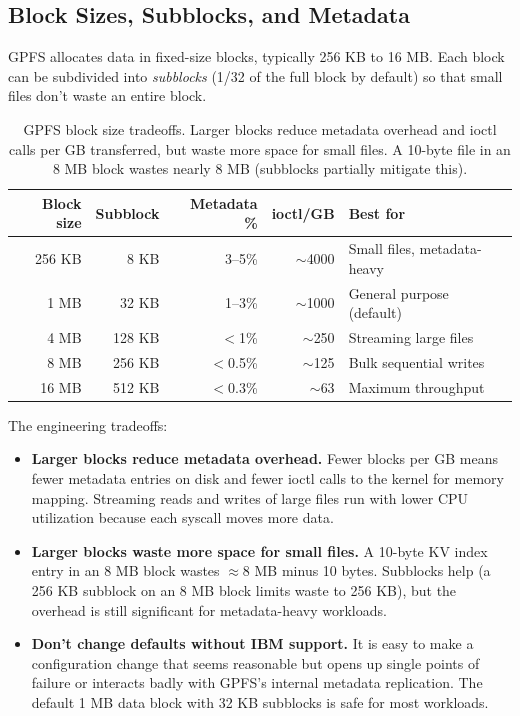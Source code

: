 \documentclass[11pt,letterpaper]{article}
\begin{document}
\subsection{Block Sizes, Subblocks, and Metadata}

GPFS allocates data in fixed-size blocks, typically 256 KB to 16 MB. Each block can be subdivided into \emph{subblocks} (1/32 of the full block by default) so that small files don't waste an entire block.

\begin{table}[ht]
\centering\small
\begin{tabular}{rrrrl}
\toprule
\textbf{Block size} & \textbf{Subblock} & \textbf{Metadata \%} & \textbf{ioctl/GB} & \textbf{Best for} \\
\midrule
256 KB & 8 KB & 3--5\% & $\sim$4000 & Small files, metadata-heavy \\
1 MB & 32 KB & 1--3\% & $\sim$1000 & General purpose (default) \\
4 MB & 128 KB & $<$1\% & $\sim$250 & Streaming large files \\
8 MB & 256 KB & $<$0.5\% & $\sim$125 & Bulk sequential writes \\
16 MB & 512 KB & $<$0.3\% & $\sim$63 & Maximum throughput \\
\bottomrule
\end{tabular}
\caption{GPFS block size tradeoffs. Larger blocks reduce metadata overhead and ioctl calls per GB transferred, but waste more space for small files. A 10-byte file in an 8 MB block wastes nearly 8 MB (subblocks partially mitigate this).}
\label{tab:block_sizes}
\end{table}

The engineering tradeoffs:

\begin{itemize}
\item \textbf{Larger blocks reduce metadata overhead.} Fewer blocks per GB means fewer metadata entries on disk and fewer ioctl calls to the kernel for memory mapping. Streaming reads and writes of large files run with lower CPU utilization because each syscall moves more data.
\item \textbf{Larger blocks waste more space for small files.} A 10-byte KV index entry in an 8 MB block wastes $\approx$8 MB minus 10 bytes. Subblocks help (a 256 KB subblock on an 8 MB block limits waste to 256 KB), but the overhead is still significant for metadata-heavy workloads.
\item \textbf{Don't change defaults without IBM support.} It is easy to make a configuration change that seems reasonable but opens up single points of failure or interacts badly with GPFS's internal metadata replication. The default 1 MB data block with 32 KB subblocks is safe for most workloads.
\end{itemize}
\end{document}

